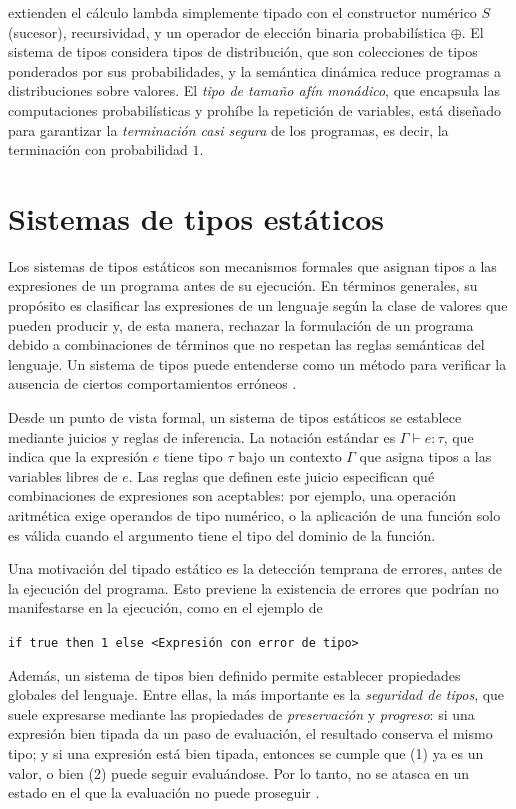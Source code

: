 \citet{pt} extienden el cálculo lambda simplemente tipado con el constructor numérico $S$ (sucesor), recursividad, y un operador de elección binaria probabilística $\oplus$. El sistema de tipos considera tipos de distribución, que son colecciones de tipos ponderados por sus probabilidades, y la semántica dinámica reduce programas a distribuciones sobre valores. El \emph{tipo de tamaño afín monádico}, que encapsula las computaciones probabilísticas y prohíbe la repetición de variables, está diseñado para garantizar la \emph{terminación casi segura} de los programas, es decir, la terminación con probabilidad $1$.


\section{Sistemas de tipos estáticos}

Los sistemas de tipos estáticos son mecanismos formales que asignan
tipos a las expresiones de un programa antes de su ejecución. En
términos generales, su propósito es clasificar las expresiones de un
lenguaje según la clase de valores que pueden producir y, de esta
manera, rechazar la formulación de un programa debido a combinaciones
de términos que no respetan las reglas semánticas del lenguaje. Un
sistema de tipos puede entenderse como un método para verificar la
ausencia de ciertos comportamientos erróneos \citep{pierce}.

Desde un punto de vista formal, un sistema de tipos estáticos se
establece mediante juicios y reglas de inferencia. La notación
estándar es $\Gamma \vdash e : \tau$, que indica que la expresión $e$
tiene tipo $\tau$ bajo un contexto $\Gamma$ que asigna tipos a las
variables libres de $e$.  Las reglas que definen este juicio
especifican qué combinaciones de expresiones son aceptables: por
ejemplo, una operación aritmética exige operandos de tipo numérico, o
la aplicación de una función solo es válida cuando el argumento tiene
el tipo del dominio de la función.

Una motivación del tipado estático es la detección temprana de
errores, antes de la ejecución del programa. Esto previene la
existencia de errores que podrían no manifestarse en la ejecución,
como en el ejemplo de \citet{pierce}
\begin{center}
  \verb|if true then 1 else <Expresión con error de tipo>|
\end{center}

Además, un sistema de tipos bien definido permite establecer
propiedades globales del lenguaje. Entre ellas, la más importante es
la \emph{seguridad de tipos}, que suele
expresarse mediante las propiedades de \emph{preservación} y
\emph{progreso}: si una expresión bien tipada da un paso de evaluación, el resultado
conserva el mismo tipo; y si una expresión está bien tipada, entonces
se cumple que (1) ya es un valor, o bien (2) puede seguir evaluándose. Por lo tanto, no
se atasca en un estado en el que la evaluación no puede proseguir
\citep{pierce, harper}.


